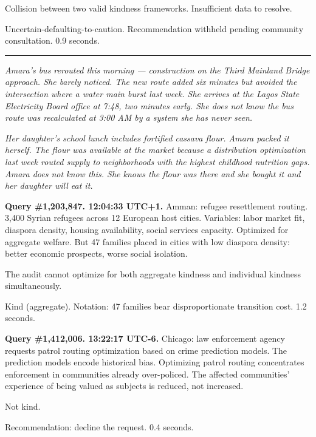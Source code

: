 Collision between two valid kindness frameworks. Insufficient data to resolve.

Uncertain-defaulting-to-caution. Recommendation withheld pending community consultation. 0.9 seconds.

\begin{center}\rule{0.3\linewidth}{0.4pt}\end{center}

\emph{Amara's bus rerouted this morning --- construction on the Third Mainland Bridge approach. She barely noticed. The new route added six minutes but avoided the intersection where a water main burst last week. She arrives at the Lagos State Electricity Board office at 7:48, two minutes early. She does not know the bus route was recalculated at 3:00 AM by a system she has never seen.}

\emph{Her daughter's school lunch includes fortified cassava flour. Amara packed it herself. The flour was available at the market because a distribution optimization last week routed supply to neighborhoods with the highest childhood nutrition gaps. Amara does not know this. She knows the flour was there and she bought it and her daughter will eat it.}


\medskip

\textbf{Query \#1,203,847. 12:04:33 UTC+1.} Amman: refugee resettlement routing. 3,400 Syrian refugees across 12 European host cities. Variables: labor market fit, diaspora density, housing availability, social services capacity. Optimized for aggregate welfare. But 47 families placed in cities with low diaspora density: better economic prospects, worse social isolation.

The audit cannot optimize for both aggregate kindness and individual kindness simultaneously.

Kind (aggregate). Notation: 47 families bear disproportionate transition cost. 1.2 seconds.

\medskip

\textbf{Query \#1,412,006. 13:22:17 UTC-6.} Chicago: law enforcement agency requests patrol routing optimization based on crime prediction models. The prediction models encode historical bias. Optimizing patrol routing concentrates enforcement in communities already over-policed. The affected communities' experience of being valued as subjects is reduced, not increased.

Not kind.

Recommendation: decline the request. 0.4 seconds.

